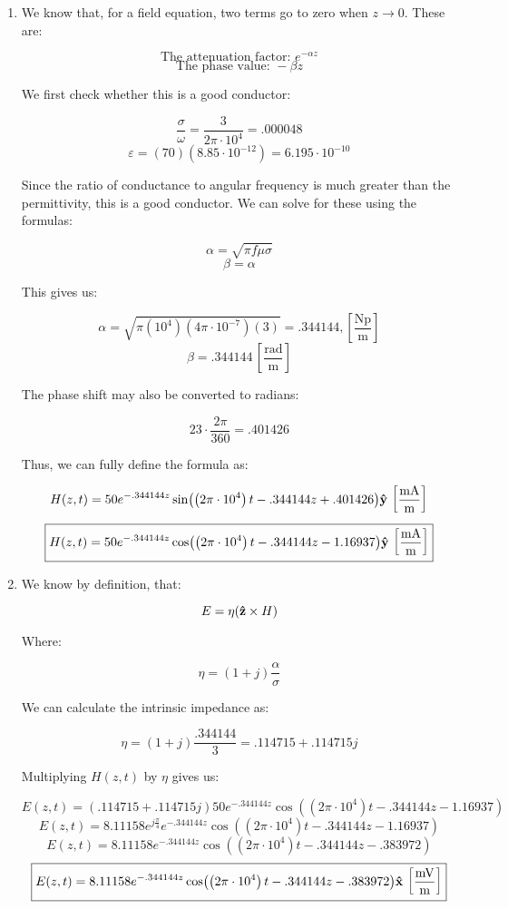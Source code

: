 \begin{enumerate}
\begin{enumerate}
      \item 

        We know that, for a field equation, two terms go to zero when $z\to0$. These are:

        $$\text{The attenuation factor: }e^{-\alpha z}$$
        $$\text{The phase value: }-\beta z$$

        We first check whether this is a good conductor:

        $$\frac{\sigma}{\omega}=\frac{3}{2\pi\cdot10^4}=.000048$$
        $$\varepsilon=(70)(8.85\cdot10^{-12})=6.195\cdot10^{-10}$$

        Since the ratio of conductance to angular frequency is much greater than the permittivity, this is a good conductor. We can solve for these using the formulas:

        $$\alpha=\sqrt{\pi f\mu\sigma}$$
        $$\beta=\alpha$$

        This gives us:

        $$\alpha=\sqrt{\pi(10^4)(4\pi\cdot10^{-7})(3)}=.344144,\left[ \frac{\text{Np}}{\si{\meter}} \right]$$
        $$\beta=.344144\,\left[ \frac{\text{rad}}{\si{\meter}} \right]$$

        The phase shift may also be converted to radians:

        $$23\cdot\frac{2\pi}{360}=.401426$$

        Thus, we can fully define the formula as:

        $$H(z,t)=50e^{-.344144z}\sin( \left( 2\pi\cdot10^4\right)t-.344144z+.401426)\bold{\hat{y}}\,\left[ \frac{\si{\milli\ampere}}{\si{\meter}} \right]$$
        $$\boxed{H(z,t)=50e^{-.344144z}\cos( \left( 2\pi\cdot10^4\right)t-.344144z-1.16937)\bold{\hat{y}}\,\left[ \frac{\si{\milli\ampere}}{\si{\meter}} \right]}$$

      \item 

        We know by definition, that:

        $$E=\eta (\bold{\hat{z}}\times H)$$

        Where:

        $$\eta=(1+j)\frac{\alpha}{\sigma}$$

        We can calculate the intrinsic impedance as:

        $$\eta=(1+j)\frac{.344144}{3}=.114715+.114715j$$

        Multiplying $H(z,t)$ by $\eta$ gives us:

        $$E(z,t)=(.114715+.114715j)50e^{-.344144z}\cos( \left( 2\pi\cdot10^4\right)t-.344144z-1.16937)$$
        $$E(z,t)=8.11158e^{j\frac{\pi}{4}}e^{-.344144z}\cos( \left( 2\pi\cdot10^4\right)t-.344144z-1.16937)$$
        $$E(z,t)=8.11158e^{-.344144z}\cos( \left( 2\pi\cdot10^4\right)t-.344144z-.383972)$$
        $$\boxed{E(z,t)=8.11158e^{-.344144z}\cos( \left( 2\pi\cdot10^4\right)t-.344144z-.383972)\bold{\hat{x}}\,\left[ \frac{\si{\milli\volt}}{\si{\meter}} \right]}$$


\end{enumerate}
\end{enumerate}
